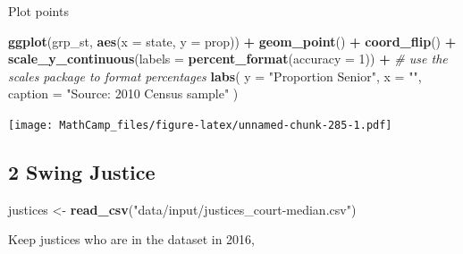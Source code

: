 \documentclass[
]{book}
\newenvironment{Shaded}{\begin{snugshade}}{\end{snugshade}}
\newcommand{\CommentTok}[1]{\textcolor[rgb]{0.56,0.35,0.01}{\textit{#1}}}
\newcommand{\DataTypeTok}[1]{\textcolor[rgb]{0.13,0.29,0.53}{#1}}
\newcommand{\DecValTok}[1]{\textcolor[rgb]{0.00,0.00,0.81}{#1}}
\newcommand{\KeywordTok}[1]{\textcolor[rgb]{0.13,0.29,0.53}{\textbf{#1}}}
\newcommand{\NormalTok}[1]{#1}
\newcommand{\OperatorTok}[1]{\textcolor[rgb]{0.81,0.36,0.00}{\textbf{#1}}}
\newcommand{\StringTok}[1]{\textcolor[rgb]{0.31,0.60,0.02}{#1}}
\theoremstyle{definition}
\theoremstyle{definition}
\theoremstyle{definition}
\theoremstyle{definition}
\theoremstyle{remark}
\begin{document}
Plot points

\begin{Shaded}
\begin{Highlighting}[]
\KeywordTok{ggplot}\NormalTok{(grp_st, }\KeywordTok{aes}\NormalTok{(}\DataTypeTok{x =}\NormalTok{ state, }\DataTypeTok{y =}\NormalTok{ prop)) }\OperatorTok{+}
\StringTok{  }\KeywordTok{geom_point}\NormalTok{() }\OperatorTok{+}
\StringTok{  }\KeywordTok{coord_flip}\NormalTok{() }\OperatorTok{+}
\StringTok{  }\KeywordTok{scale_y_continuous}\NormalTok{(}\DataTypeTok{labels =} \KeywordTok{percent_format}\NormalTok{(}\DataTypeTok{accuracy =} \DecValTok{1}\NormalTok{)) }\OperatorTok{+}\StringTok{ }\CommentTok{# use the scales package to format percentages}
\StringTok{  }\KeywordTok{labs}\NormalTok{(}
    \DataTypeTok{y =} \StringTok{"Proportion Senior"}\NormalTok{,}
    \DataTypeTok{x =} \StringTok{""}\NormalTok{,}
    \DataTypeTok{caption =} \StringTok{"Source: 2010 Census sample"}
\NormalTok{  )}
\end{Highlighting}
\end{Shaded}

\texttt{[image: MathCamp\_files/figure-latex/unnamed-chunk-285-1.pdf]}

\hypertarget{swing-justice}{%
\subsection*{2 Swing Justice}\label{swing-justice}}

\begin{Shaded}
\begin{Highlighting}[]
\NormalTok{justices <-}\StringTok{ }\KeywordTok{read_csv}\NormalTok{(}\StringTok{"data/input/justices_court-median.csv"}\NormalTok{)}
\end{Highlighting}
\end{Shaded}

Keep justices who are in the dataset in 2016,

\begin{Shaded}
\end{Shaded}
\end{document}
